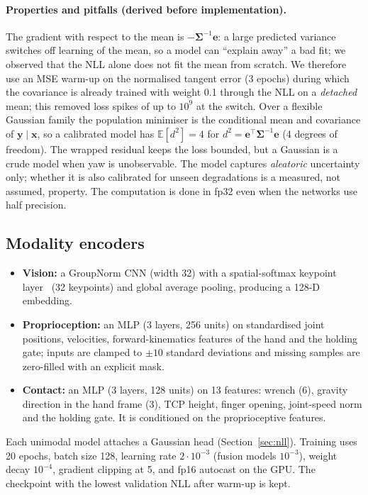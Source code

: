 \documentclass[11pt,a4paper]{article}
\newcommand{\vect}[1]{\bm{#1}}
\begin{document}
\paragraph{Properties and pitfalls (derived before implementation).}
The gradient with respect to the mean is $-\vect\Sigma^{-1}\vect e$: a large predicted variance switches off learning of the mean, so a model can ``explain away'' a bad fit; we observed that the NLL alone does not fit the mean from scratch. We therefore use an MSE warm-up on the normalised tangent error (3 epochs) during which the covariance is already trained with weight 0.1 through the NLL on a \emph{detached} mean; this removed loss spikes of up to $10^{9}$ at the switch. Over a flexible Gaussian family the population minimiser is the conditional mean and covariance of $\vect y\mid\vect x$, so a calibrated model has $\mathbb E[d^2]=4$ for $d^2=\vect e^\top\vect\Sigma^{-1}\vect e$ (4 degrees of freedom). The wrapped residual keeps the loss bounded, but a Gaussian is a crude model when yaw is unobservable. The model captures \emph{aleatoric} uncertainty only; whether it is also calibrated for unseen degradations is a measured, not assumed, property. The computation is done in fp32 even when the networks use half precision.

\subsection{Modality encoders}
\begin{itemize}
\item \textbf{Vision:} a GroupNorm CNN (width 32) with a spatial-softmax keypoint layer~\cite{finn2016deep} (32 keypoints) and global average pooling, producing a 128-D embedding.
\item \textbf{Proprioception:} an MLP (3 layers, 256 units) on standardised joint positions, velocities, forward-kinematics features of the hand and the holding gate; inputs are clamped to $\pm10$ standard deviations and missing samples are zero-filled with an explicit mask.
\item \textbf{Contact:} an MLP (3 layers, 128 units) on 13 features: wrench (6), gravity direction in the hand frame (3), TCP height, finger opening, joint-speed norm and the holding gate. It is conditioned on the proprioceptive features.
\end{itemize}
Each unimodal model attaches a Gaussian head (Section~\ref{sec:nll}). Training uses 20 epochs, batch size 128, learning rate $2\cdot10^{-3}$ (fusion models $10^{-3}$), weight decay $10^{-4}$, gradient clipping at 5, and fp16 autocast on the GPU. The checkpoint with the lowest validation NLL after warm-up is kept.
\end{document}
